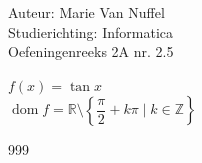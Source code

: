 \documentclass[a4paper]{article}
\newcommand{\R}{\mathbb{R}}
\begin{document}
  
\noindent \large Auteur: Marie Van Nuffel \\
\noindent \large Studierichting: Informatica\\
\noindent \large Oefeningenreeks 2A nr. 2.5\\

\medskip

\normalsize

$f(x) = \tan{x}$\\

$\operatorname{dom} f = \R \setminus \left\{ \dfrac{\pi}{2}+k\pi \mid k \in \mathbb{Z}\right\}$\\

\begin{thebibliography}{999}
\end{thebibliography}
\end{document}
